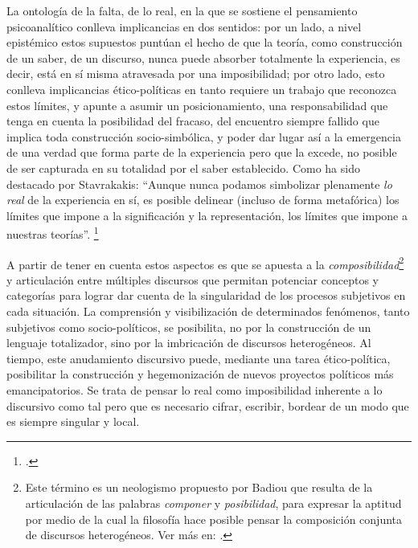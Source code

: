 La ontología de la falta, de lo real, en la que se sostiene el pensamiento psicoanalítico conlleva implicancias en dos sentidos: por un lado, a nivel epistémico estos supuestos puntúan el hecho de que la teoría, como construcción de un saber, de un discurso, nunca puede absorber totalmente la experiencia, es decir, está en sí misma atravesada por una imposibilidad; por otro lado, esto conlleva implicancias ético-políticas en tanto requiere un trabajo que reconozca estos límites, y apunte a asumir un posicionamiento, una responsabilidad que tenga en cuenta la posibilidad del fracaso, del encuentro siempre fallido que implica toda construcción socio-simbólica, y poder dar lugar así a la emergencia de una verdad que forma parte de la experiencia pero que la excede, no posible de ser capturada en su totalidad por el saber establecido. Como ha sido destacado por Stavrakakis: \enquote{Aunque nunca podamos simbolizar plenamente \emph{lo real} de la experiencia en sí, es posible delinear (incluso de forma metafórica) los límites que impone a la significación y la representación, los límites que impone a nuestras teorías}. \footcite[][31]{@7003-STAVRAKAKIS2010}

A partir de tener en cuenta estos aspectos es que se apuesta a la \emph{composibilidad}\footnote{Este término es un neologismo propuesto por Badiou que resulta de la articulación de las palabras \emph{componer} y \emph{posibilidad}, para expresar la aptitud por medio de la cual la filosofía hace posible pensar la composición conjunta de discursos heterogéneos. Ver más en: \cite[]{@7072-BADIOU2002}.} y articulación entre múltiples discursos que permitan potenciar conceptos y categorías para lograr dar cuenta de la singularidad de los procesos subjetivos en cada situación. La comprensión y visibilización de determinados fenómenos, tanto subjetivos como socio-políticos, se posibilita, no por la construcción de un lenguaje totalizador, sino por la imbricación de discursos heterogéneos. Al tiempo, este anudamiento discursivo puede, mediante una tarea ético-política, posibilitar la construcción y hegemonización de nuevos proyectos políticos más emancipatorios. Se trata de pensar lo real como imposibilidad inherente a lo discursivo como tal pero que es necesario cifrar, escribir, bordear de un modo que es siempre singular y local.\cite[][]{@7077-FARRAN2009}

